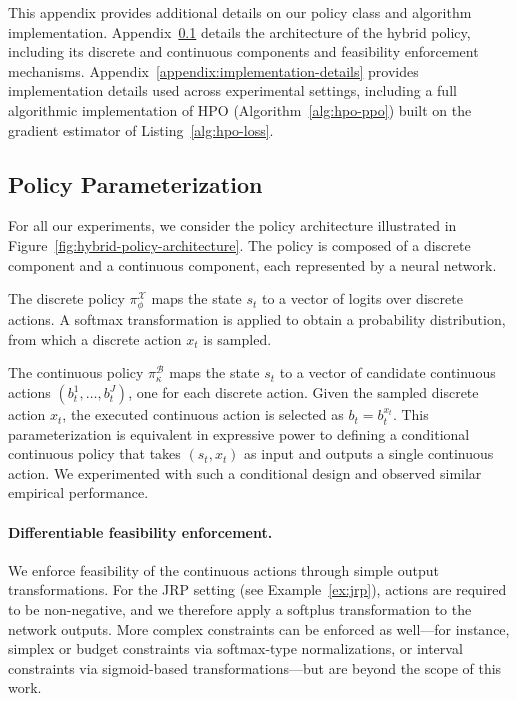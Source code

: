 \documentclass{article}
\theoremstyle{definition}
\theoremstyle{remark}
\begin{document}
This appendix provides additional details on our policy class and algorithm implementation. Appendix~\ref{appendix:policy-parameterization} details the architecture of the hybrid policy, including its discrete and continuous components and feasibility enforcement mechanisms. Appendix~\ref{appendix:implementation-details} provides implementation details used across experimental settings, including a full algorithmic implementation of HPO (Algorithm~\ref{alg:hpo-ppo}) built on the gradient estimator of Listing~\ref{alg:hpo-loss}.

\subsection{Policy Parameterization}
\label{appendix:policy-parameterization}

For all our experiments, we consider the policy architecture illustrated in Figure~\ref{fig:hybrid-policy-architecture}. The policy is composed of a discrete component and a continuous component, each represented by a neural network.

The discrete policy $\pi^{\mathcal X}_{\phi}$ maps the state $s_t$ to a vector of logits over discrete actions. A softmax transformation is applied to obtain a probability distribution, from which a discrete action $x_t$ is sampled.

The continuous policy $\pi^{\mathcal B}_{\kappa}$ maps the state $s_t$ to a vector of candidate continuous actions $(b_t^1,\dots,b_t^J)$, one for each discrete action. Given the sampled discrete action $x_t$, the executed continuous action is selected as $b_t = b_t^{x_t}$. This parameterization is equivalent in expressive power to defining a conditional continuous policy that takes $(s_t, x_t)$ as input and outputs a single continuous action. We experimented with such a conditional design and observed similar empirical performance.

\paragraph{Differentiable feasibility enforcement.}
We enforce feasibility of the continuous actions through simple output transformations. For the JRP setting (see Example~\ref{ex:jrp}), actions are required to be non-negative, and we therefore apply a softplus transformation to the network outputs. More complex constraints can be enforced as well—for instance, simplex or budget constraints via softmax-type normalizations, or interval constraints via sigmoid-based transformations—but are beyond the scope of this work.
\end{document}
